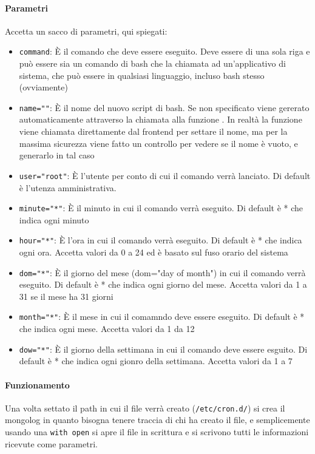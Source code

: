 \documentclass[11pt]{article}
\begin{document}
\paragraph{Parametri}
Accetta un sacco di parametri, qui spiegati:
\begin{itemize}
	\item{\texttt{command}: È il comando che deve essere eseguito. Deve essere di una sola riga e può essere sia
		un comando di bash che la chiamata ad un'applicativo di sistema, che può essere in qualsiasi linguaggio,
		incluso bash stesso (ovviamente)}
	\item{\texttt{name=""}: È il nome del nuovo script di bash. Se non specificato viene gererato automaticamente
		attraverso la chiamata alla funzione . In realtà la funzione viene chiamata
		direttamente dal frontend per settare il nome, ma per la massima sicurezza viene fatto un controllo
		per vedere se il nome è vuoto, e generarlo in tal caso}
	\item{\texttt{user="root"}: È l'utente per conto di cui il comando verrà lanciato. Di default è l'utenza amministrativa.}
	\item{\texttt{minute="*"}: È il minuto in cui il comando verrà eseguito. Di default è * che indica ogni minuto}
	\item{\texttt{hour="*"}: È l'ora in cui il comando verrà eseguito. Di default è * che indica ogni ora. Accetta valori
		da 0 a 24 ed è basato sul fuso orario del sistema}
	\item{\texttt{dom="*"}: È il giorno del mese (dom="day of month")  in cui il comando verrà eseguito.
		Di default è * che indica ogni giorno del mese. Accetta valori da 1 a 31 se il mese ha 31 giorni}
	\item{\texttt{month="*"}: È il mese in cui il comamndo deve essere eseguito. Di default è * che indica ogni mese.
		Accetta valori da 1 da 12}
	\item{\texttt{dow="*"}: È il giorno della settimana in cui il comando deve essere esguito.
		Di default è * che indica ogni gionro della settimana. Accetta valori da 1 a 7}
\end{itemize}
\paragraph{Funzionamento}
Una volta settato il path in cui il file verrà creato (\texttt{/etc/cron.d/}) si crea il mongolog in quanto bisogna tenere
traccia di chi ha creato il file, e semplicemente usando una \texttt{with open} si apre il file in scrittura e si scrivono
tutti le informazioni ricevute come parametri.
\end{document}

